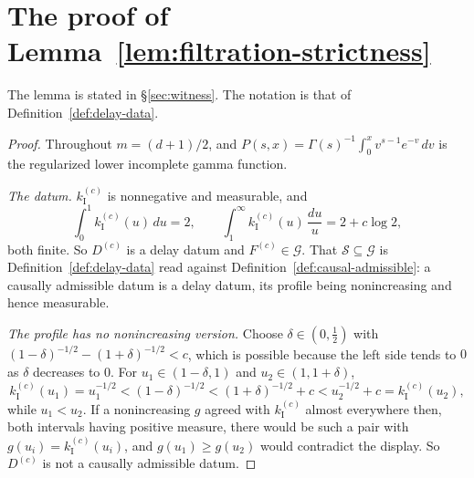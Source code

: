 
\section{The proof of Lemma~\ref{lem:filtration-strictness}}\label{app:strictness}

The lemma is stated in \S\ref{sec:witness}. The notation is that of
Definition~\ref{def:delay-data}.

\begin{proof}
Throughout $m = (d+1)/2$, and $P(s,x) = \Gamma(s)^{-1}\int_0^x v^{s-1}e^{-v}\,dv$ is the
regularized lower incomplete gamma function.

\emph{The datum.} $k^{(c)}_{\mathrm I}$ is nonnegative and measurable, and
\[
  \int_0^1 k^{(c)}_{\mathrm I}(u)\,du = 2, \qquad
  \int_1^\infty k^{(c)}_{\mathrm I}(u)\,\frac{du}{u} = 2 + c\log 2 ,
\]
both finite. So $D^{(c)}$ is a delay datum and $F^{(c)} \in \mathcal{G}$. That
$\mathcal{S} \subseteq \mathcal{G}$ is Definition~\ref{def:delay-data} read against
Definition~\ref{def:causal-admissible}: a causally admissible datum is a delay datum, its profile
being nonincreasing and hence measurable.

\emph{The profile has no nonincreasing version.} Choose $\delta \in (0,\tfrac12)$ with
$(1-\delta)^{-1/2} - (1+\delta)^{-1/2} < c$, which is possible because the left side tends to $0$
as $\delta$ decreases to $0$. For $u_1 \in (1-\delta,1)$ and $u_2 \in (1,1+\delta)$,
\[
  k^{(c)}_{\mathrm I}(u_1) = u_1^{-1/2} < (1-\delta)^{-1/2} < (1+\delta)^{-1/2} + c
   < u_2^{-1/2} + c = k^{(c)}_{\mathrm I}(u_2) ,
\]
while $u_1 < u_2$. If a nonincreasing $g$ agreed with $k^{(c)}_{\mathrm I}$ almost everywhere then,
both intervals having positive measure, there would be such a pair with
$g(u_i) = k^{(c)}_{\mathrm I}(u_i)$, and $g(u_1) \ge g(u_2)$ would contradict the display. So
$D^{(c)}$ is not a causally admissible datum.


\end{proof}
